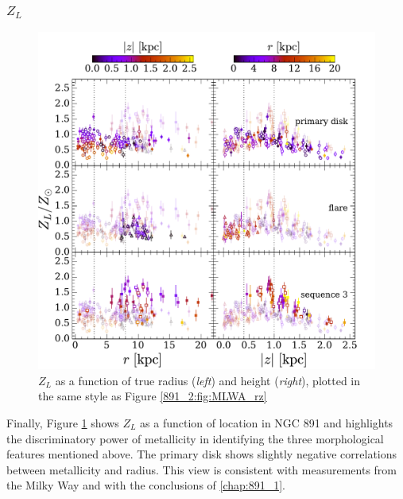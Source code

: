 
\subsubsection{{\Large $Z_L$}}

\begin{figure}
  \centering
  \includegraphics[width=\textwidth]{891_2/figs/MLWZ_rz_all.pdf}
  \caption[$Z_L$ vs
    ($r,|z|$)]{\fixspacing\label{891_2:fig:MLWZ_rz}$Z_L$ as a function
    of true radius (\emph{left}) and height (\emph{right}), plotted in
    the same style as Figure \ref{891_2:fig:MLWA_rz}}
\end{figure}

Finally, Figure \ref{891_2:fig:MLWZ_rz} shows $Z_L$ as a function of
location in NGC 891 and highlights the discriminatory power of
metallicity in identifying the three morphological features mentioned
above. The primary disk shows slightly negative correlations between
metallicity and radius. This view is consistent with measurements from
the Milky Way \citep{Bovy12, Hayden14} and with the conclusions of
\ref{chap:891_1}. 

